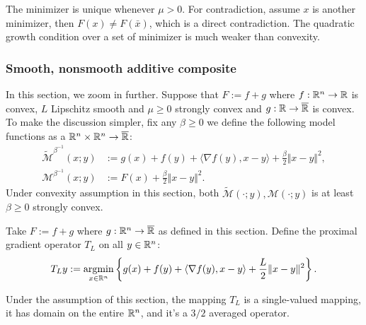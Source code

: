 \documentclass[12pt]{article}
\begin{document}
        \begin{remark}
            The minimizer is unique whenever $\mu > 0$. 
            For contradiction, assume $x$ is another minimizer, then $F(x) \neq F(\bar x)$, which is a direct contradiction. 
            The quadratic growth condition over a set of minimizer is much weaker than convexity. 
        \end{remark}
        
        \subsubsection{Smooth, nonsmooth additive composite}\label{sssec:additive-composite}
            In this section, we zoom in further. 
            Suppose that $F:= f + g$ where $f:\mathbb R^n \rightarrow \mathbb R$ is convex, $L$ Lipschitz smooth and $\mu \ge 0$ strongly convex and $g: \mathbb R\rightarrow \overline {\mathbb R}$ is convex. 
            To make the discussion simpler, fix any $\beta \ge 0$ we define the following model functions as a $\mathbb R^n \times \mathbb R^n \rightarrow \overline {\mathbb R}$: 
            \begin{align*}
                \widetilde{\mathcal M}^{\beta^{-1}}
                (x; y)
                &:= 
                g(x) + f(y) + \langle \nabla f(y), x - y\rangle
                + \frac{\beta}{2}\Vert x - y\Vert^2,
                \\
                \mathcal M^{\beta^{-1}}(x; y) 
                &:= F(x) + \frac{\beta}{2}\Vert x - y\Vert^2.
            \end{align*}
            Under convexity assumption in this section, both $\widetilde {\mathcal M} (\cdot; y),  {\mathcal M}(\cdot;y )$ is at least $\beta \ge 0$ strongly convex. 
            \begin{definition}\label{def:proximal-gradient-operator}
                Take $F := f + g$ where $g: \mathbb R^n \rightarrow \overline {\mathbb R}$ as defined in this section. 
                Define the proximal gradient operator $T_L$ on all $y \in \mathbb R^n$: 
                \begin{align*}
                    T_L y := \mathop{\rm argmin}\limits_{x \in \mathbb R^n} \left\lbrace
                        g(x) + f(y) + \langle \nabla f(y), x - y\rangle 
                        + \frac{L}{2}\Vert x- y \Vert^2
                    \right\rbrace. 
                \end{align*}
            \end{definition}
            \begin{remark}
                Under the assumption of this section, the mapping $T_L$ is a single-valued mapping, it has domain on the entire $\mathbb R^n$, and it's a $3/2$ averaged operator. 
            \end{remark}
\end{document}

